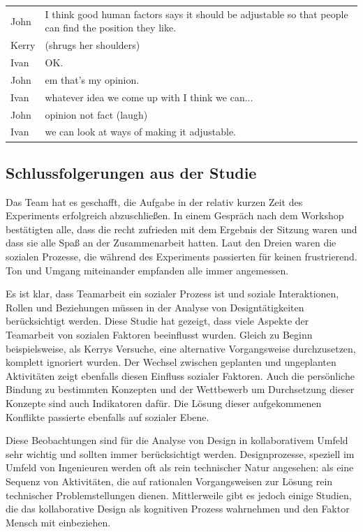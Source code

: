 \begin{extract}[Kerry und Ivan finden Johns Einwand nicht so gut.]
	{
		\myfloatalign
		\begin{tabularx}{\textwidth}{p{1cm}X}
    		John & I think good human factors says it should be adjustable so that people can find the position they like. \\
			Kerry & (shrugs her shoulders) \\
			Ivan & OK. \\
			John & em that's my opinion. \\
			Ivan & whatever idea we come up with I think we can...\\
			John & opinion not fact (laugh)\\
			Ivan & we can look at ways of making it adjustable.\\
		\end{tabularx}
	}
\end{extract} 

\subsection{Schlussfolgerungen aus der Studie}

Das Team hat es geschafft, die Aufgabe in der relativ kurzen Zeit des Experiments erfolgreich abzuschließen. In einem Gespräch nach dem Workshop bestätigten alle, dass die recht zufrieden mit dem Ergebnis der Sitzung waren und dass sie alle Spaß an der Zusammenarbeit hatten. Laut den Dreien waren die sozialen Prozesse, die während des Experiments passierten für keinen frustrierend. Ton und Umgang miteinander empfanden alle immer angemessen.

\medskip Es ist klar, dass Teamarbeit ein sozialer Prozess ist und soziale Interaktionen, Rollen und Beziehungen müssen in der Analyse von Designtätigkeiten berücksichtigt werden. Diese Studie hat gezeigt, dass viele Aspekte der Teamarbeit von sozialen Faktoren beeinflusst wurden. Gleich zu Beginn beispielsweise, als Kerrys Versuche, eine alternative Vorgangsweise durchzusetzen, komplett ignoriert wurden. Der Wechsel zwischen geplanten und ungeplanten Aktivitäten zeigt ebenfalls diesen Einfluss sozialer Faktoren. Auch die persönliche Bindung zu bestimmten Konzepten und der Wettbewerb um Durchsetzung dieser Konzepte sind auch Indikatoren dafür. Die Lösung dieser aufgekommenen Konflikte passierte ebenfalls auf sozialer Ebene.

\medskip Diese Beobachtungen sind für die Analyse von Design in kollaborativem Umfeld sehr wichtig und sollten immer berücksichtigt werden. Designprozesse, speziell im Umfeld von Ingenieuren werden oft als rein technischer Natur angesehen: als eine Sequenz von Aktivitäten, die auf rationalen Vorgangsweisen zur Lösung rein technischer Problemstellungen dienen. Mittlerweile gibt es jedoch einige Studien, die das kollaborative Design als kognitiven Prozess wahrnehmen und den Faktor Mensch mit einbeziehen. \citep{Cross:1995}

